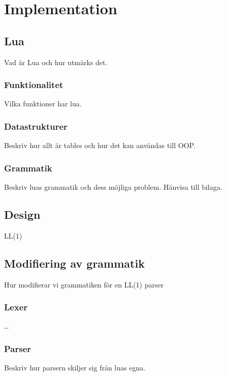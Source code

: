 \section{Implementation}

\subsection{Lua}

Vad är Lua och hur utmärks det.

\subsubsection{Funktionalitet}

Vilka funktioner har lua.

\subsubsection{Datastrukturer}

Beskriv hur allt är tables och hur det kan användas till OOP.

\subsubsection{Grammatik}

Beskriv luas grammatik och dess möjliga problem. Hänvisa till bilaga.

\subsection{Design}

LL(1)

\subsection{Modifiering av grammatik}

Hur modifierar vi grammatiken för en LL(1) parser

\subsubsection{Lexer}

\ldots

\subsubsection{Parser}

Beskriv hur parsern skiljer sig från luas egna.

